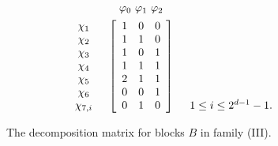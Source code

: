 \documentclass{amsart}
\theoremstyle{plain}
\theoremstyle{definition}
\theoremstyle{remark}
\begin{document}
\begin{figure}[ht]  
\caption{\label{fig:decoma7}The decomposition matrix for blocks  
$B$ in family (III).}
$$\begin{array}{ccc}
&\begin{array}{c@{}c@{}c}\varphi_0\,&\,\varphi_1\,&\,\varphi_2\end{array}\\[1ex]
\begin{array}{c}\chi_1\\ \chi_2\\ \chi_3 \\ \chi_4\\ \chi_5\\ \chi_6\\ \chi_{7,i}\end{array} &
\left[\begin{array}{ccc}1&0&0\\1&1&0\\1&0&1\\1&1&1\\2&1&1\\0&0&1\\0&1&0\end{array}\right]
&\begin{array}{c}\\ \\ \\ \\ \\ \\1\le i\le 2^{d-1}-1.\end{array}
\end{array}$$
\vspace{1ex}
\end{figure}
\end{document}

